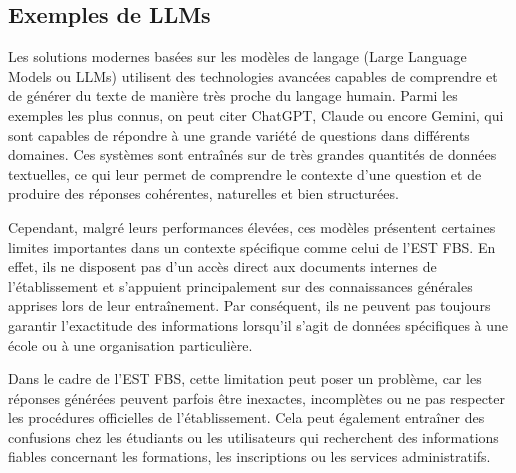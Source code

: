 \documentclass[12pt, a4paper, twoside]{report}
\begin{document}
\subsection{Exemples de LLMs}

Les solutions modernes basées sur les modèles de langage (Large Language Models ou LLMs) utilisent des technologies avancées capables de comprendre et de générer du texte de manière très proche du langage humain. Parmi les exemples les plus connus, on peut citer ChatGPT, Claude ou encore Gemini, qui sont capables de répondre à une grande variété de questions dans différents domaines. Ces systèmes sont entraînés sur de très grandes quantités de données textuelles, ce qui leur permet de comprendre le contexte d’une question et de produire des réponses cohérentes, naturelles et bien structurées.

Cependant, malgré leurs performances élevées, ces modèles présentent certaines limites importantes dans un contexte spécifique comme celui de l’EST FBS. En effet, ils ne disposent pas d’un accès direct aux documents internes de l’établissement et s’appuient principalement sur des connaissances générales apprises lors de leur entraînement. Par conséquent, ils ne peuvent pas toujours garantir l’exactitude des informations lorsqu’il s’agit de données spécifiques à une école ou à une organisation particulière.

Dans le cadre de l’EST FBS, cette limitation peut poser un problème, car les réponses générées peuvent parfois être inexactes, incomplètes ou ne pas respecter les procédures officielles de l’établissement. Cela peut également entraîner des confusions chez les étudiants ou les utilisateurs qui recherchent des informations fiables concernant les formations, les inscriptions ou les services administratifs.
\end{document}
